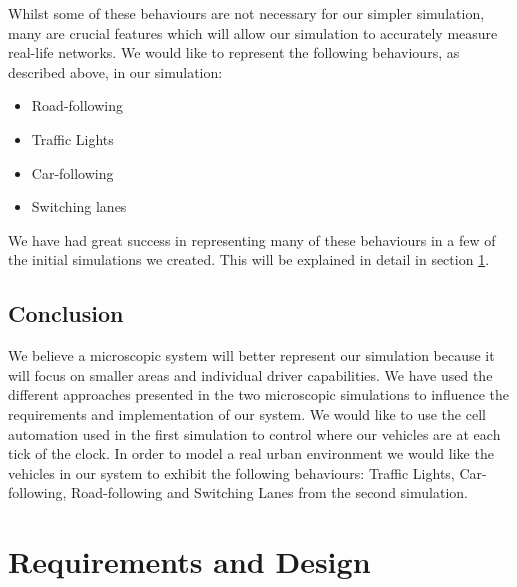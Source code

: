 \documentclass{article}
\begin{document}
	Whilst some of these behaviours are not necessary for our simpler simulation, many are crucial features which will allow our simulation to accurately measure real-life networks. 
	We would like to represent the following behaviours, as described above, in our simulation: 
	
	\begin{itemize}
		\item Road-following
		\item Traffic Lights
		\item Car-following
		\item Switching lanes
	\end{itemize}
	We have had great success in representing many of these behaviours in a few of the initial simulations we created. 
	This will be explained in detail in section \ref{RequirementsAndDeisgn}. 
	
	
	\subsection{Conclusion}
	We believe a microscopic system will better represent our simulation because it will focus on smaller areas and individual driver capabilities. 
	We have used the different approaches presented in the two microscopic simulations to influence the requirements and implementation of our system. 
	We would like to use the cell automation used in the first simulation to control where our vehicles are at each tick of the clock. 
	In order to model a real urban environment we would like the vehicles in our system to exhibit the following behaviours: Traffic Lights, Car-following, Road-following and Switching Lanes from the second simulation.
	
	
	\section{Requirements and Design}\label{RequirementsAndDeisgn}
	
\end{document}
